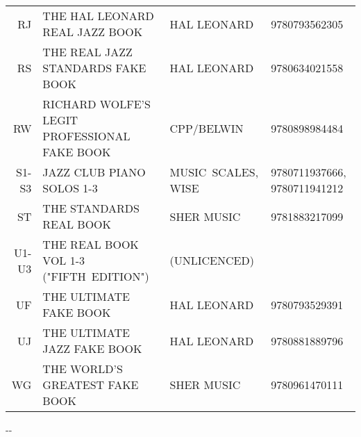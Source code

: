 \documentclass[8pt]{scrartcl}
\begin{document}
\begin{center}
\begin{tabular}{rp{}p{}p{}}
    RJ    & THE HAL LEONARD REAL JAZZ BOOK                  & HAL LEONARD        & 9780793562305 \\
    RS    & THE REAL JAZZ STANDARDS FAKE BOOK               & HAL LEONARD        & 9780634021558 \\
    RW    & RICHARD WOLFE'S LEGIT PROFESSIONAL FAKE BOOK    & CPP/BELWIN         & 9780898984484 \\
    S1-S3 & JAZZ CLUB PIANO SOLOS 1-3                       & MUSIC~SCALES, WISE & 9780711937666, 9780711941212 \\
    ST    & THE STANDARDS REAL BOOK                         & SHER MUSIC         & 9781883217099 \\
    U1-U3 & THE REAL BOOK VOL 1-3 ("FIFTH~EDITION")         & (UNLICENCED)       & \\
    UF    & THE ULTIMATE FAKE BOOK                          & HAL LEONARD        & 9780793529391 \\
    UJ    & THE ULTIMATE JAZZ FAKE BOOK                     & HAL LEONARD        & 9780881889796 \\
    WG    & THE WORLD'S GREATEST FAKE BOOK                  & SHER MUSIC         & 9780961470111 \\


  \end{tabular}
\end{center}

\begin{multicols}{3}
  \raggedright
  
\end{multicols}

\begin{center}
  \the\year-\the\month-\the\day
\end{center}
\end{document}
